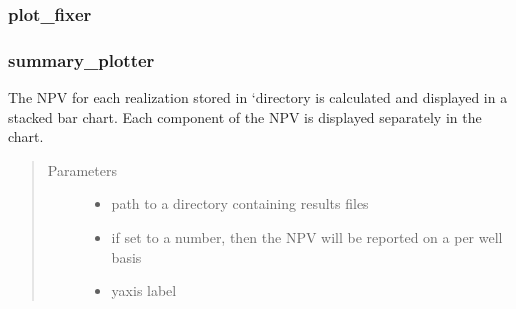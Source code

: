 \documentclass[letterpaper,10pt,english]{sphinxmanual}
\begin{document}
\subsubsection{plot\_fixer}
\label{\detokenize{index:plot-fixer}}

\begin{fulllineitems}
\label{\detokenize{index:feast.ResultsProcessing.plotting_functions.plot_fixer}}
\end{fulllineitems}



\subsubsection{summary\_plotter}
\label{\detokenize{index:summary-plotter}}

\begin{fulllineitems}
\label{\detokenize{index:feast.ResultsProcessing.plotting_functions.summary_plotter}}
The NPV for each realization stored in ‘directory is calculated and displayed in a stacked bar chart. Each component
of the NPV is displayed separately in the chart.
\begin{quote}\begin{description}
\item[{Parameters}] \leavevmode\begin{itemize}
\item {} 
 \textendash{} path to a directory containing results files

\item {} 
 \textendash{} if set to a number, then the NPV will be reported on a per well basis

\item {} 
 \textendash{} yaxis label

\end{itemize}

\end{description}\end{quote}

\end{fulllineitems}
\end{document}
